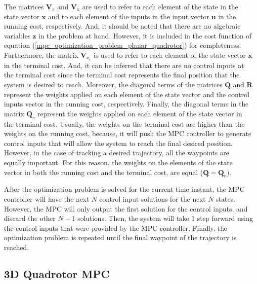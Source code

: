 \documentclass{thesisreport}
\begin{document}
The matrices $\bm{V}_x$ and  $\bm{V}_u$ are used to refer to each element of the state in the state vector $\bm{x}$ and to each element of the inputs in the input vector $\bm{u}$ in the running cost, respectively. And, it should be noted that there are no algebraic variables $\bm{z}$ in the problem at hand. However, it is included in the cost function of equation (\ref{mpc_optimization_problem_planar_quadrotor}) for completeness. Furthermore, the matrix $\bm{V}_{x_e}$ is used to refer to each element of the state vector $\bm{x}$ in the terminal cost. And, it can be inferred that there are no control inputs at the terminal cost since the terminal cost represents the final position that the system is desired to reach.
Moreover, the diagonal terms of the matrices $\bm{Q}$ and $\bm{R}$ represent the weights applied on each element of the state vector and the control inputs vector in the running cost, respectively. Finally, the diagonal terms in the matrix $\bm{Q}_e$ represent the weights applied on each element of the state vector in the terminal cost. Usually, the weights on the terminal cost are higher than the weights on the running cost, because, it will push the MPC controller to generate control inputs that will allow the system to reach the final desired position. However, in the case of tracking a desired trajectory, all the waypoints are equally important. For this reason, the weights on the elements of the state vector in both the running cost and the terminal cost, are equal ($\bm{Q}=\bm{Q}_e$). 


After the optimization problem is solved for the current time instant, the MPC controller will have the next $N$ control input solutions for the next $N$ states. However, the MPC will only output the first solution for the control inputs, and discard the other $N-1$ solutions. Then, the system will take 1 step forward using the control inputs that were provided by the MPC controller. Finally, the optimization problem is repeated until the final waypoint of the trajectory is reached.

\newpage

\subsection{3D Quadrotor MPC}
\end{document}
